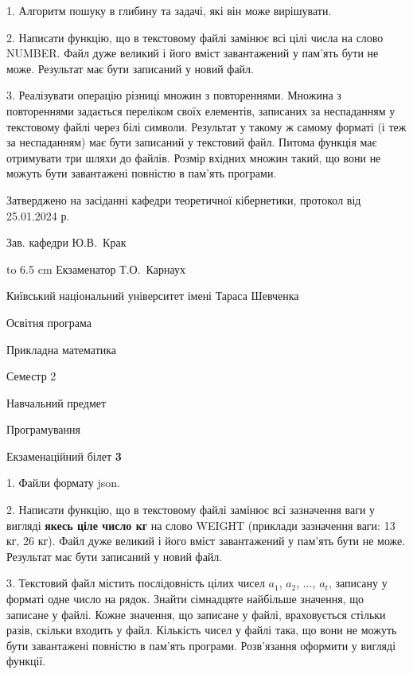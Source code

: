 \documentclass[12pt, ukrainian]{article}
\begin{document}
{%
1. Алгоритм пошуку в глибину та задачі, які він може вирішувати.%
\par
2. Написати функцію, що в текстовому файлі замінює всі цілі числа на слово NUMBER. Файл дуже великий і його вміст завантажений у пам'ять бути не може. Результат має бути записаний у новий файл.

\par
3. Реалізувати операцію різниці множин з повтореннями. Множина з повтореннями задається переліком своїх елементів, записаних за неспаданням у текстовому файлі через білі символи. Результат у такому ж самому форматі (і теж за неспаданням) має бути записаний у текстовий файл. Питома функція має отримувати три шляхи до файлів. Розмір вхідних множин такий, що вони не можуть бути завантажені повністю в пам’ять програми.

}
{\smallskip\smallskip \begin {scriptsize} Затверджено на засіданні кафедри теоретичної кібернетики, протокол   від   25.01.2024 р.\par\smallskip\smallskip\smallskip\smallskip
{\parbox {6.5 cm} {Зав. кафедри \dotfill Ю.В.~Крак}}\hspace {0.7cm} {\hbox to 6.5 cm { Екзаменатор \dotfill Т.О.~Карнаух}} \end{scriptsize}}
\vspace{0.9cm}
{{\begin {scriptsize}\par
{ \center  Київський національний університет імені Тараса Шевченка \par}
{\parbox {5 cm}{Освітня програма \hfill}{\parbox {7 cm}{Прикладна математика\hfill}}\parbox {6 cm}{\hfill Семестр 2}}\par
{\parbox {5 cm} {Навчальний предмет \hfill}\parbox {7 cm}{Програмування \hfill}\parbox {6cm}{\hfill}\par}\vspace{-15pt} \end{scriptsize}}{\center Екзаменаційний білет \No \textbf { 3 }\par}}
{%
1. Файли формату json.%
\par
2. Написати функцію, що в текстовому файлі замінює всі зазначення ваги у вигляді \textbf{якесь ціле число кг} на слово WEIGHT (приклади зазначення ваги: 13 кг, 26   кг). Файл дуже великий і його вміст завантажений у пам'ять бути не може. Результат має бути записаний у новий файл.

\par
3. Текстовий файл містить послідовність цілих чисел $a_1$, $a_2$, $\ldots$, $a_t$, записану у форматі одне число на рядок. Знайти сімнадцяте найбільше значення, що записане у файлі. Кожне значення, що записане у файлі, враховується стільки разів, скільки входить у файл. Кількість чисел у файлі така, що вони не можуть бути завантажені повністю в пам'ять програми. Розв'язання оформити у вигляді функції.

}
\end{document}
